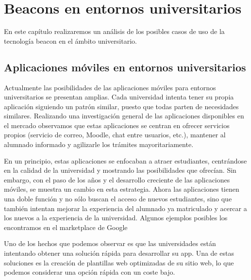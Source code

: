 %
%
%
%


\chapter{Beacons en entornos universitarios} \label{chap:BeaconsEntornosUniversitarios}  


En este capítulo realizaremos un análisis de los posibles casos de uso de la tecnología beacon en el ámbito universitario.

 
\section{Aplicaciones móviles en entornos universitarios}


Actualmente las posibilidades de las aplicaciones móviles para entornos universitarios se presentan amplias.  Cada universidad intenta tener su propia aplicación siguiendo un patrón similar, puesto que todas parten de necesidades similares. Realizando una investigación general de las aplicaciones disponibles en el mercado observamos que estas aplicaciones se centran en ofrecer servicios propios (servicio de correo, Moodle, chat entre usuarios, etc.), mantener al alumnado informado y agilizarle los trámites mayoritariamente. 

En un principio, estas aplicaciones se enfocaban a atraer estudiantes, centrándose en la calidad de la universidad y mostrando las posibilidades que ofrecían. Sin embargo, con el paso de los años y el desarrollo creciente de las aplicaciones móviles, se muestra un cambio en esta estrategia. Ahora las aplicaciones tienen una doble función y no sólo buscan el acceso de nuevos estudiantes, sino que también intentan mejorar la experiencia del alumnado ya matriculado y acercar a los nuevos a la experiencia de la universidad. 
Algunos ejemplos posibles los encontramos en el marketplace de Google \cite{URL::galileo, URL::valladolid, URL::oviedo}


Uno de los hechos que podemos observar es que las universidades están intentando obtener una solución rápida para desarrollar su app. Una de estas soluciones es la creación de plantillas web optimizadas de su sitio web, lo que podemos considerar una opción rápida con un coste bajo.


